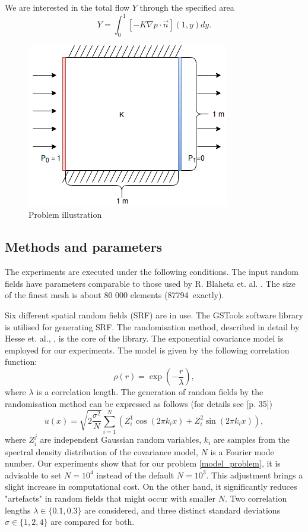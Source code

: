 \documentclass{article}
\begin{document}
We are interested in the total flow $Y$ through the specified area
\begin{equation}
Y = \int_{0}^{1}[-K\nabla p \cdot \vec{n}] (1, y) dy\text{.}
\end{equation}

\begin{figure}[!htp]
\centering
\includegraphics[width=0.5\linewidth]{porous_media_flow/problem_illustration.png}
\caption{Problem illustration}
\label{fig:benchmark_task}
\centering
\end{figure}
\FloatBarrier

\subsection{Methods and parameters}
The experiments are executed under the following conditions.
The input random fields have parameters comparable to those used by R. Blaheta et. al. \cite{Blaheta20160413}. The size of the finest mesh is about 80 000 elements (87794~exactly). 

Six different spatial random fields (SRF) are in use. The GSTools software library \cite{GSTools} is utilised for generating SRF. The randomisation method, described in detail by Hesse et. al., \cite{Hesse2014}, is the core of the library. The exponential covariance model is employed for our experiments. The model is given by the following correlation function:
$$
\rho(r) = \exp\left(-\frac{r}{\lambda}\right),
$$
where $\lambda$ is a correlation length. The generation of random fields by the randomisation method can be expressed as follows (for details see  \cite{Hesse2014}[p. 35])
$$
u(x) = \sqrt{2 \frac{\sigma^2}{N}} \sum_{i=1}^{N}{\left( Z_i^1\cos(2\pi k_i x) + Z_i^2\sin(2\pi k_i x)   \right)},
$$
where $Z_i^j$ are independent Gaussian random variables, $k_i$ are samples from the spectral density distribution of the covariance model, $N$ is a Fourier mode number.
Our experiments show that for our problem \ref{model_problem}, it is advisable to set $N=10^4$ instead of the default $N=10^3$. This adjustment brings a slight increase in computational cost. On the other hand, it significantly reduces "artefacts" in random fields that might occur with smaller $N$. %
Two correlation lengths $\lambda \in \{0.1, 0.3\}$ are considered, and three distinct standard deviations $\sigma \in \{1, 2, 4\}$ are compared for both.
\end{document}
